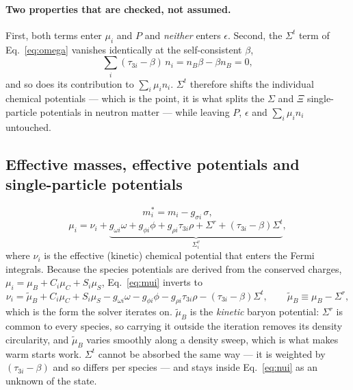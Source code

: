 \documentclass[aps,prc,onecolumn,superscriptaddress,nofootinbib,10pt]{revtex4-2}
\newcommand{\nB}{n_B}
\newcommand{\muB}{\mu_B}
\newcommand{\muC}{\mu_C}
\newcommand{\muS}{\mu_S}
\newcommand{\mutB}{\tilde{\mu}_B}
\newcommand{\Sigmar}{\Sigma^{r}}
\newcommand{\Sigmat}{\Sigma^{t}}
\newcommand{\meff}[1]{m^{*}_{#1}}
\begin{document}
\paragraph{Two properties that are checked, not assumed.} First, both terms
enter $\mu_i$ and $P$ and \emph{neither} enters $\epsilon$. Second, the
$\Sigmat$ term of Eq.~\eqref{eq:omega} vanishes identically at the
self-consistent $\beta$,
\begin{equation}
  \sum_i (\tau_{3i} - \beta)\, n_i = \nB \beta - \beta \nB = 0 ,
  \label{eq:sigmatcancel}
\end{equation}
and so does its contribution to $\sum_i \mu_i n_i$. $\Sigmat$ therefore shifts
the individual chemical potentials --- which is the point, it is what splits
the $\Sigma$ and $\Xi$ single-particle potentials in neutron matter --- while
leaving $P$, $\epsilon$ and $\sum_i \mu_i n_i$ untouched.

\subsection{Effective masses, effective potentials and single-particle potentials}

\begin{equation}
  \meff{i} = m_i - g_{\sigma i}\,\sigma ,
  \label{eq:meff}
\end{equation}
\begin{equation}
  \mu_i = \nu_i + \underbrace{g_{\omega i}\omega + g_{\phi i}\phi
          + g_{\rho i}\tau_{3i}\rho + \Sigmar
          + (\tau_{3i} - \beta)\Sigmat}_{\textstyle \Sigma^v_i} ,
  \label{eq:mui}
\end{equation}
where $\nu_i$ is the effective (kinetic) chemical potential that enters the
Fermi integrals. Because the species potentials are derived from the conserved
charges, $\mu_i = \muB + C_i \muC + S_i \muS$, Eq.~\eqref{eq:mui} inverts to
\begin{equation}
  \nu_i = \mutB + C_i \muC + S_i \muS
          - g_{\omega i}\omega - g_{\phi i}\phi - g_{\rho i}\tau_{3i}\rho
          - (\tau_{3i} - \beta)\Sigmat ,
  \qquad \mutB \equiv \muB - \Sigmar ,
  \label{eq:nui}
\end{equation}
which is the form the solver iterates on. $\mutB$ is the \emph{kinetic} baryon
potential: $\Sigmar$ is common to every species, so carrying it outside the
iteration removes its density circularity, and $\mutB$ varies smoothly along a
density sweep, which is what makes warm starts work. $\Sigmat$ cannot be
absorbed the same way --- it is weighted by $(\tau_{3i}-\beta)$ and so differs
per species --- and stays inside Eq.~\eqref{eq:nui} as an unknown of the state.
\end{document}
